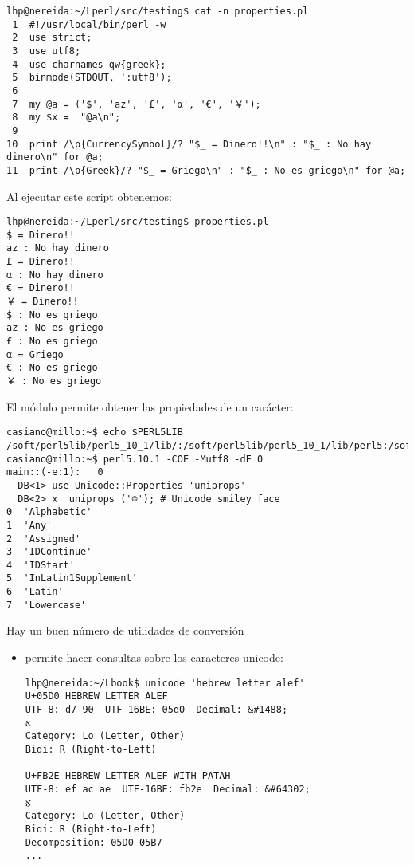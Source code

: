 \begin{htmlonly}
\begin{htmlonly}
\begin{verbatim}
lhp@nereida:~/Lperl/src/testing$ cat -n properties.pl
 1  #!/usr/local/bin/perl -w
 2  use strict;
 3  use utf8;
 4  use charnames qw{greek};
 5  binmode(STDOUT, ':utf8');
 6
 7  my @a = ('$', 'az', '£', 'α', '€', '￥');
 8  my $x =  "@a\n";
 9
10  print /\p{CurrencySymbol}/? "$_ = Dinero!!\n" : "$_ : No hay dinero\n" for @a;
11  print /\p{Greek}/? "$_ = Griego\n" : "$_ : No es griego\n" for @a;
\end{verbatim}
Al ejecutar este script obtenemos:

\begin{verbatim}
lhp@nereida:~/Lperl/src/testing$ properties.pl
$ = Dinero!!
az : No hay dinero
£ = Dinero!!
α : No hay dinero
€ = Dinero!!
￥ = Dinero!!
$ : No es griego
az : No es griego
£ : No es griego
α = Griego
€ : No es griego
￥ : No es griego
\end{verbatim}

El módulo  permite obtener las 
propiedades de un carácter:

\begin{verbatim}
casiano@millo:~$ echo $PERL5LIB
/soft/perl5lib/perl5_10_1/lib/:/soft/perl5lib/perl5_10_1/lib/perl5:/soft/perl5lib/perl5_10_1/share/perl/5.8.8/
casiano@millo:~$ perl5.10.1 -COE -Mutf8 -dE 0
main::(-e:1):   0
  DB<1> use Unicode::Properties 'uniprops'
  DB<2> x  uniprops ('☺'); # Unicode smiley face
0  'Alphabetic'
1  'Any'
2  'Assigned'
3  'IDContinue'
4  'IDStart'
5  'InLatin1Supplement'
6  'Latin'
7  'Lowercase'
\end{verbatim}


Hay un buen número de utilidades de conversión 

\begin{itemize}
\item
{} permite hacer consultas sobre los caracteres unicode:

\begin{verbatim}
lhp@nereida:~/Lbook$ unicode 'hebrew letter alef'
U+05D0 HEBREW LETTER ALEF
UTF-8: d7 90  UTF-16BE: 05d0  Decimal: &#1488;
א
Category: Lo (Letter, Other)
Bidi: R (Right-to-Left)

U+FB2E HEBREW LETTER ALEF WITH PATAH
UTF-8: ef ac ae  UTF-16BE: fb2e  Decimal: &#64302;
אַ
Category: Lo (Letter, Other)
Bidi: R (Right-to-Left)
Decomposition: 05D0 05B7
...
\end{verbatim}


\end{itemize}
\end{htmlonly}
\end{htmlonly}
